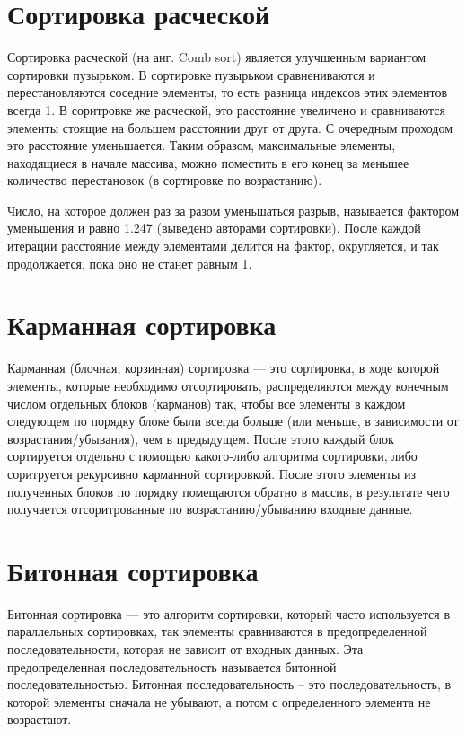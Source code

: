 \documentclass[12pt]{report}
\begin{document}
	
	\section{Сортировка расческой}
	
	 Сортировка расческой (на анг. Comb sort) является улучшенным вариантом сортировки пузырьком. В сортировке пузырьком сравнениваются и перестановляются соседние элементы, то есть разница индексов этих элементов всегда 1. В соритровке же расческой, это расстояние увеличено и сравниваются элементы стоящие на большем расстоянии друг от друга. С очередным проходом это расстояние уменьшается. Таким образом, максимальные элементы, находящиеся в начале массива, можно поместить в его конец за меньшее количество перестановок (в сортировке по возрастанию). 
	 
	 Число, на которое должен раз за разом уменьшаться разрыв, называется фактором уменьшения и равно 1.247 (выведено авторами сортировки). После каждой итерации расстояние между элементами делится на фактор, округляется, и так продолжается, пока оно не станет равным 1.
	
	\section{Карманная сортировка}
	
	Карманная (блочная, корзинная) сортировка — это сортировка, в ходе которой элементы, которые необходимо отсортировать, распределяются между конечным числом отдельных блоков (карманов) так, чтобы все элементы в каждом следующем по порядку блоке были всегда больше (или меньше, в зависимости от возрастания/убывания), чем в предыдущем. После этого каждый блок сортируется отдельно с помощью какого-либо алгоритма сортировки, либо соритруется рекурсивно карманной сортировкой. После этого элементы из полученных блоков по порядку помещаются обратно в массив, в результате чего получается отсоритрованные по возрастанию/убыванию входные данные.

	
	\section{Битонная сортировка}
	
	Битонная сортировка — это алгоритм сортировки, который часто используется в параллельных сортировках, так элементы сравниваются в предопределенной последовательности, которая не зависит от входных данных. Эта предопределенная последовательность называется битонной последовательностью. Битонная последовательность -- это последовательность, в которой элементы сначала не убывают, а потом с определенного элемента не возрастают.
	
\end{document}
